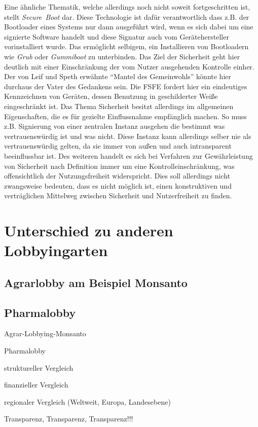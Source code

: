 Eine ähnliche Thematik, welche allerdings noch nicht soweit fortgeschritten 
ist, stellt \emph{Secure~Boot} dar. Diese Technologie ist dafür verantwortlich 
dass z.B. der Bootloader eines Systems nur dann ausgeführt wird, wenn es sich 
dabei um eine signierte Software handelt und diese Signatur auch vom 
Gerätehersteller vorinstalliert wurde. Das ermöglicht selbigem, ein 
Installieren von Bootloadern wie \emph{Grub} oder \emph{Gummiboot} zu 
unterbinden. Das Ziel der Sicherheit geht hier deutlich mit einer Einschränkung 
der vom Nutzer ausgehenden Kontrolle einher. Der von Leif und Speth erwähnte 
``Mantel des Gemeinwohls'' \cite{LeifSpeth200312} könnte hier durchaus der 
Vater des Gedankens sein. Die FSFE fordert hier ein eindeutiges Kennzeichnen 
von Geräten, dessen Benutzung in geschilderter Weiße eingeschränkt ist. 
\cite{FsfeSecureBoot} Das Thema Sicherheit besitzt allerdings im allgemeinen 
Eigenschaften, die es für gezielte Einflussnahme empfänglich machen. So muss 
z.B. Signierung von einer zentralen Instanz ausgehen die bestimmt was 
vertrauenswürdig ist und was nicht. Diese Instanz kann allerdings selber nie 
als vertrauenswürdig gelten, da sie immer von außen und auch intransparent 
beeinflussbar ist. Des weiteren handelt es sich bei Verfahren zur 
Gewährleistung von Sicherheit nach Definition immer um eine 
Kontrolleinschränkung, was offensichtlich der Nutzungsfreiheit widerspricht. 
Dies soll allerdings nicht zwangsweise bedeuten, dass es nicht möglich ist, 
einen konstruktiven und verträglichen Mittelweg zwischen Sicherheit und 
Nutzerfreiheit zu finden.

\section{Unterschied zu anderen Lobbyingarten}
\subsection{Agrarlobby am Beispiel Monsanto}
\subsection{Pharmalobby}
\begin{itemize*}
\item Agrar-Lobbying-Monsanto
\item Pharmalobby \cite{BeckLobbyGesundwe}
\item struktureller Vergleich
\item finanzieller Vergleich
\item regionaler Vergleich (Weltweit, Europa, Landesebene)
\item Transparenz, Transparenz, Transparenz!!!
\end{itemize*}

